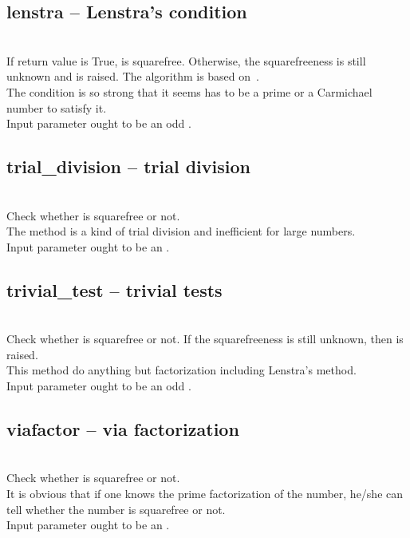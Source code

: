  \subsection{lenstra -- Lenstra's condition}
 \\
 \spacing
 \quad If return value is True,  is squarefree.  Otherwise, the
 squarefreeness is still unknown and  is raised.
 The algorithm is based on~\cite{Lenstra1979}. \\
 \spacing
 \negok The condition is so strong that it seems  has to be a
 prime or a Carmichael number to satisfy it.\\
 \spacing
 \quad Input parameter  ought to be an odd .
 \subsection{trial\_division -- trial division}
 \\
 \spacing
 \quad Check whether  is squarefree or not. \\
 \spacing
 The method is a kind of trial division and inefficient for large numbers. \\
 \spacing
 \quad Input parameter  ought to be an .
% 
 \subsection{trivial\_test -- trivial tests}
 \\
 \spacing
 \quad Check whether  is squarefree or not.  If the squarefreeness is still unknown, then  is raised. \\
 \spacing
 This method do anything but factorization including Lenstra's method. \\
 \spacing
 \quad Input parameter  ought to be an odd .
% 
 \subsection{viafactor -- via factorization}
 \\
 \spacing
 \quad Check whether  is squarefree or not. \\
 \spacing
 It is obvious that if one knows the prime factorization of the number, he/she can tell whether the number is squarefree or not. \\
 \spacing
 \quad Input parameter  ought to be an .
% 
